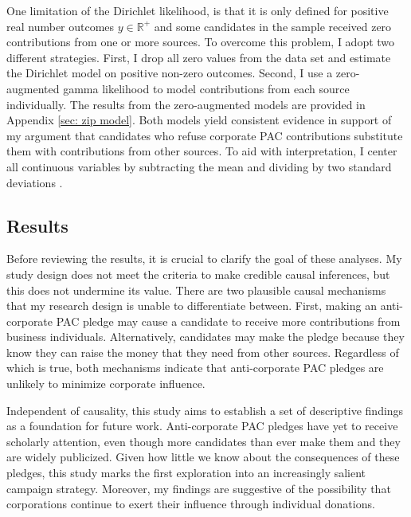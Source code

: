 \documentclass[12pt]{article}
\begin{document}
One limitation of the Dirichlet likelihood, is that it is only defined for positive real number outcomes $y \in  \mathbb{R}^+$ and some candidates in the sample received zero contributions from one or more sources. To overcome this problem, I adopt two different strategies. First, I drop all zero values from the data set and estimate the Dirichlet model on positive non-zero outcomes. Second, I use a zero-augmented gamma likelihood to model contributions from each source individually. The results from the zero-augmented models are provided in Appendix \ref{sec: zip model}. Both models yield consistent evidence in support of my argument that candidates who refuse corporate PAC contributions substitute them with contributions from other sources. To aid with interpretation, I center all continuous variables by subtracting the mean and dividing by two standard deviations \citep{gelman2020}.

\subsection{Results}

Before reviewing the results, it is crucial to clarify the goal of these analyses. My study design does not meet the criteria to make credible causal inferences, but this does not undermine its value. There are two plausible causal mechanisms that my research design is unable to differentiate between. First, making an anti-corporate PAC pledge may cause a candidate to receive more contributions from business individuals. Alternatively, candidates may make the pledge because they know they can raise the money that they need from other sources. Regardless of which is true, both mechanisms indicate that anti-corporate PAC pledges are unlikely to minimize corporate influence. 

Independent of causality, this study aims to establish a set of descriptive findings as a foundation for future work. Anti-corporate PAC pledges have yet to receive scholarly attention, even though more candidates than ever make them and they are widely publicized. Given how little we know about the consequences of these pledges, this study marks the first exploration into an increasingly salient campaign strategy. Moreover, my findings are suggestive of the possibility that corporations continue to exert their influence through individual donations.
\end{document}

